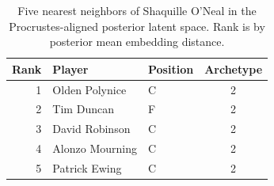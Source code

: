 \begin{table}[htbp]
  \centering\small
  \begin{tabular}{rllc}
    \toprule
    Rank & Player & Position & Archetype \\
    \midrule
    1 & Olden Polynice & C & 2 \\
    2 & Tim Duncan & F & 2 \\
    3 & David Robinson & C & 2 \\
    4 & Alonzo Mourning & C & 2 \\
    5 & Patrick Ewing & C & 2 \\
    \bottomrule
  \end{tabular}
  \caption{Five nearest neighbors of Shaquille O'Neal in the Procrustes-aligned posterior latent space. Rank is by posterior mean embedding distance.}
  \label{tab:Shaquille_O_Neal_neighbors}
\end{table}

